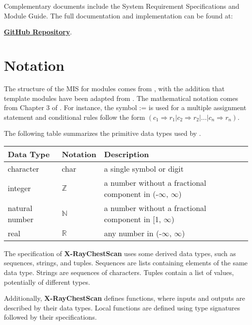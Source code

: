 \documentclass[12pt, titlepage]{article}
\begin{document}
Complementary documents include the System Requirement Specifications and Module Guide. The full documentation and implementation can be found at:

\href{https://github.com/harrisonchiu/xray/tree/main}{\textbf{GitHub Repository}}.

\section{Notation}


The structure of the MIS for modules comes from \citet{HoffmanAndStrooper1995},
with the addition that template modules have been adapted from
\cite{GhezziEtAl2003}.  The mathematical notation comes from Chapter 3 of
\citet{HoffmanAndStrooper1995}.  For instance, the symbol := is used for a
multiple assignment statement and conditional rules follow the form $(c_1
\Rightarrow r_1 | c_2 \Rightarrow r_2 | ... | c_n \Rightarrow r_n )$.

The following table summarizes the primitive data types used by \progname. 

\begin{center}
\renewcommand{\arraystretch}{1.2}
\noindent 
\begin{tabular}{l l p{7.5cm}} 
\toprule 
\textbf{Data Type} & \textbf{Notation} & \textbf{Description}\\ 
\midrule
character & char & a single symbol or digit\\
integer & $\mathbb{Z}$ & a number without a fractional component in (-$\infty$, $\infty$) \\
natural number & $\mathbb{N}$ & a number without a fractional component in [1, $\infty$) \\
real & $\mathbb{R}$ & any number in (-$\infty$, $\infty$)\\
\bottomrule
\end{tabular} 
\end{center}

\noindent
The specification of \textbf{X-RayChestScan} uses some derived data types, such as sequences, strings, and tuples. Sequences are lists containing elements of the same data type. Strings are sequences of characters. Tuples contain a list of values, potentially of different types.

Additionally, \textbf{X-RayChestScan} defines functions, where inputs and outputs are described by their data types. Local functions are defined using type signatures followed by their specifications.
\end{document}
